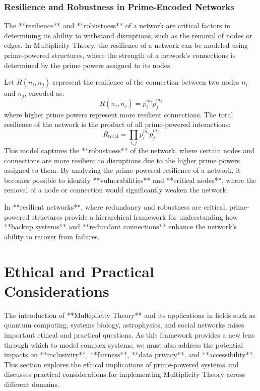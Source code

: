 \documentclass[12pt]{article}
\begin{document}
\subsubsection{Resilience and Robustness in Prime-Encoded Networks}

The **resilience** and **robustness** of a network are critical factors in determining its ability to withstand disruptions, such as the removal of nodes or edges. In Multiplicity Theory, the resilience of a network can be modeled using prime-powered structures, where the strength of a network’s connections is determined by the prime powers assigned to its nodes.

Let \( R(n_i, n_j) \) represent the resilience of the connection between two nodes \( n_i \) and \( n_j \), encoded as:
\[
R(n_i, n_j) = p_i^{m_i} p_j^{m_j}
\]
where higher prime powers represent more resilient connections. The total resilience of the network is the product of all prime-powered interactions:
\[
R_{\text{total}} = \prod_{i,j} p_i^{m_i} p_j^{m_j}
\]
This model captures the **robustness** of the network, where certain nodes and connections are more resilient to disruptions due to the higher prime powers assigned to them. By analyzing the prime-powered resilience of a network, it becomes possible to identify **vulnerabilities** and **critical nodes**, where the removal of a node or connection would significantly weaken the network.

In **resilient networks**, where redundancy and robustness are critical, prime-powered structures provide a hierarchical framework for understanding how **backup systems** and **redundant connections** enhance the network’s ability to recover from failures.

\section{Ethical and Practical Considerations}

The introduction of **Multiplicity Theory** and its applications in fields such as quantum computing, systems biology, astrophysics, and social networks raises important ethical and practical questions. As this framework provides a new lens through which to model complex systems, we must also address the potential impacts on **inclusivity**, **fairness**, **data privacy**, and **accessibility**. This section explores the ethical implications of prime-powered systems and discusses practical considerations for implementing Multiplicity Theory across different domains.
\end{document}
